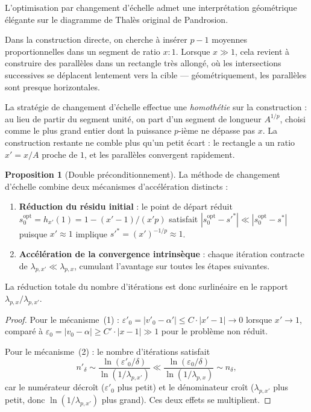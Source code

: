 \documentclass[11pt,a4paper]{article}
\theoremstyle{definition}
\newtheorem{proposition}{Proposition}[section]
\newcommand{\eps}{\varepsilon}
\begin{document}
L'optimisation par changement d'échelle admet une interprétation géométrique élégante sur le diagramme de Thalès original de Pandrosion.

\medskip

Dans la construction directe, on cherche à insérer $p-1$ moyennes proportionnelles dans un segment de ratio $x : 1$. Lorsque $x \gg 1$, cela revient à construire des parallèles dans un rectangle très allongé, où les intersections successives se déplacent lentement vers la cible --- géométriquement, les parallèles sont presque horizontales.

\smallskip

La stratégie de changement d'échelle effectue une \emph{homothétie} sur la construction : au lieu de partir du segment unité, on part d'un segment de longueur $A^{1/p}$, choisi comme le plus grand entier dont la puissance $p$-ième ne dépasse pas $x$. La construction restante ne comble plus qu'un petit écart : le rectangle a un ratio $x' = x/A$ proche de $1$, et les parallèles convergent rapidement.

\begin{proposition}[Double préconditionnement]
\label{prop:preconditioning}
La méthode de changement d'échelle combine deux mécanismes d'accélération distincts :
\begin{enumerate}
  \item \textbf{Réduction du résidu initial} : le point de départ réduit $s_0^{\mathrm{opt}} = h_{x'}(1) = 1 - (x'-1)/(x'p)$ satisfait $|s_0^{\mathrm{opt}} - s'^*| \ll |s_0^{\mathrm{opt}} - s^*|$ puisque $x' \approx 1$ implique $s'^* = (x')^{-1/p} \approx 1$.
  \item \textbf{Accélération de la convergence intrinsèque} : chaque itération contracte de $\lambda_{p,x'} \ll \lambda_{p,x}$, cumulant l'avantage sur toutes les étapes suivantes.
\end{enumerate}
La réduction totale du nombre d'itérations est donc surlinéaire en le rapport $\lambda_{p,x}/\lambda_{p,x'}$.
\end{proposition}

\begin{proof}
Pour le mécanisme~(1) : $\eps'_0 = |v'_0 - \alpha'| \leq C \cdot |x' - 1| \to 0$ lorsque $x' \to 1$, comparé à $\eps_0 = |v_0 - \alpha| \geq C' \cdot |x - 1| \gg 1$ pour le problème non réduit.

Pour le mécanisme~(2) : le nombre d'itérations satisfait
\[
  n'_\delta \sim \frac{\ln(\eps'_0/\delta)}{\ln(1/\lambda_{p,x'})} \ll \frac{\ln(\eps_0/\delta)}{\ln(1/\lambda_{p,x})} \sim n_\delta,
\]
car le numérateur décroît ($\eps'_0$ plus petit) et le dénominateur croît ($\lambda_{p,x'}$ plus petit, donc $\ln(1/\lambda_{p,x'})$ plus grand). Ces deux effets se multiplient.
\end{proof}
\end{document}

